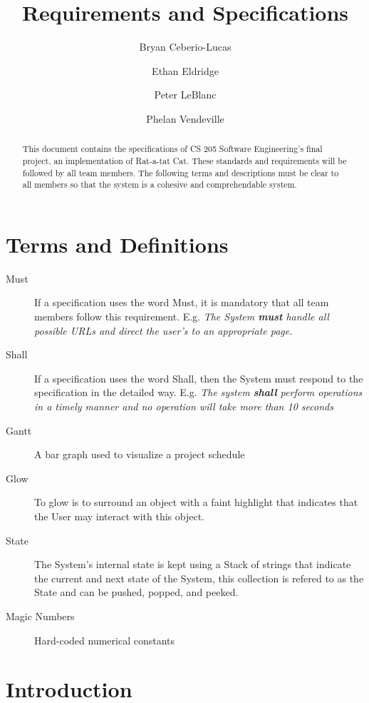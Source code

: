 \documentclass[12pt]{IEEEtran}
\title{Requirements and Specifications}
\author{Bryan Ceberio-Lucas \and Ethan Eldridge \and Peter LeBlanc \and Phelan Vendeville }
\begin{document}
\maketitle

\begin{abstract}
	This document contains the specifications of CS 205 Software  Engineering's final project, an implementation of Rat-a-tat Cat. These standards and requirements will be followed by all team members. The 			following terms and descriptions must be clear to all members so that the system is a cohesive and comprehendable system.
\end{abstract}

\tableofcontents

\section{Terms and Definitions}
\label{sec:TermsDefinitions}
	\begin{description}
		\item[Must] If a specification uses the word Must, it is mandatory that all team members follow this requirement. E.g.  \textit{The System \textbf{must} handle all possible URLs and direct the user's to an 				appropriate page.} 
		\item[Shall] If a specification uses the word Shall, then the System must respond to the specification in the detailed way. E.g. \textit{The system \textbf{shall} perform operations in a timely manner and 				no operation will take more than 10 seconds}
		\item[Gantt] A bar graph used to visualize a project schedule
		\item[Glow] To glow is to surround an object with a faint highlight that indicates that the User may interact with this object.
		\item[State] The System's internal state is kept using a Stack of strings that indicate the current and next state of the System, this collection is refered to as the State and can be pushed, popped, and 				peeked.
		\item[Magic Numbers] \hspace{4em} Hard-coded numerical constants 
	\end{description}

\section{Introduction}
\end{document}
